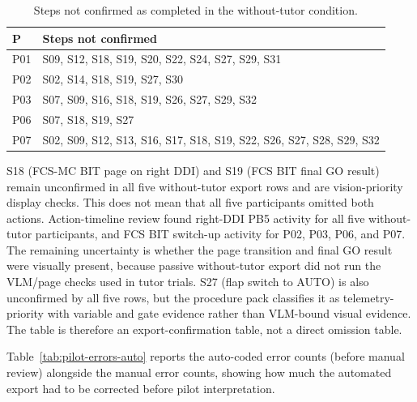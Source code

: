 \begin{table}[htbp]
\centering
\caption{Steps not confirmed as completed in the without-tutor condition.}\label{tab:pilot-uncompleted}
\small
\begin{tabularx}{\textwidth}{@{}l>{\raggedright\arraybackslash}X@{}}
\toprule
\textbf{P} & \textbf{Steps not confirmed} \\
\midrule
P01 & S09, S12, S18, S19, S20, S22, S24, S27, S29, S31 \\
P02 & S02, S14, S18, S19, S27, S30 \\
P03 & S07, S09, S16, S18, S19, S26, S27, S29, S32 \\
P06 & S07, S18, S19, S27 \\
P07 & S02, S09, S12, S13, S16, S17, S18, S19, S22, S26, S27, S28, S29, S32 \\
\bottomrule
\end{tabularx}

S18 (FCS-MC BIT page on right DDI) and S19 (FCS BIT final GO result) remain
unconfirmed in all five without-tutor export rows and are vision-priority
display checks. This does not mean that all five participants omitted both
actions. Action-timeline review found right-DDI PB5 activity for all five
without-tutor participants, and FCS BIT switch-up activity for P02, P03, P06,
and P07. The remaining uncertainty is whether the page transition and final GO
result were visually present, because passive without-tutor export did not run
the VLM/page checks used in tutor trials. S27 (flap switch to AUTO) is also
unconfirmed by all five rows, but the procedure pack classifies it as
telemetry-priority with variable and gate evidence rather than VLM-bound visual
evidence. The table is therefore an export-confirmation table, not a direct
omission table.
\end{table}

Table~\ref{tab:pilot-errors-auto} reports the auto-coded error counts (before
manual review) alongside the manual error counts, showing how much the
automated export had to be corrected before pilot interpretation.


